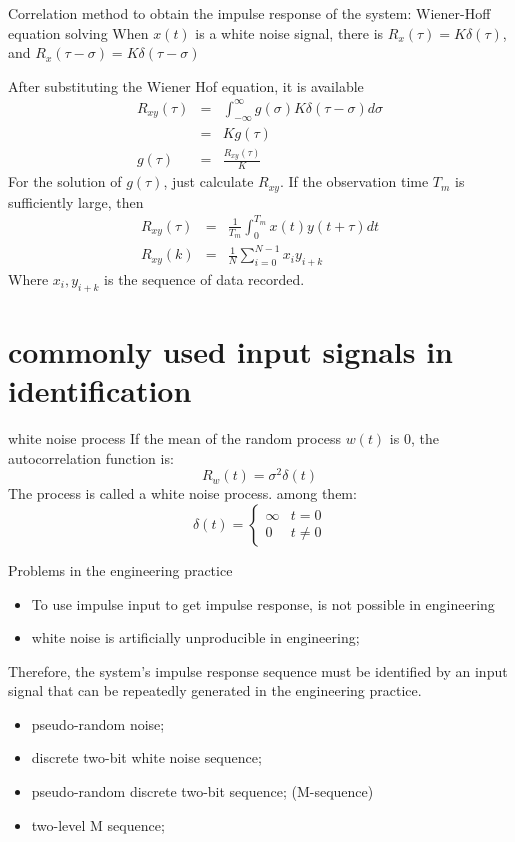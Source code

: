 \begin{frame}{Correlation method to obtain the impulse response of the system: Wiener-Hoff equation solving}
When $x(t)$ is a white noise signal, there is $R_x(\tau)=K\delta(\tau)$, and
$R_x(\tau-\sigma) = K\delta(\tau-\sigma)$

After substituting the Wiener Hof equation, it is available
\begin{eqnarray*}
R_{xy}(\tau) &=& \int_{-\infty}^{\infty}g(\sigma)K\delta(\tau-\sigma)d\sigma \\
&=& Kg(\tau) \\
g(\tau)&=& \frac{R_{xy}(\tau)}{K}
\end{eqnarray*}
For the solution of $g(\tau)$, just calculate $R_{xy}$. If the observation time $T_m$ is sufficiently large, then
\begin{eqnarray*}
R_{xy}(\tau) &=& \frac{1}{T_m}\int_0^{T_m}x(t)y(t+\tau)dt \\
R_{xy}(k) &=& \frac{1}{N}\sum_{i=0}^{N-1}x_i y_{i+k}
\end{eqnarray*}
Where $x_i, y_{i+k}$ is the sequence of data recorded.
\end{frame}

\section{commonly used input signals in identification}
\begin{frame}{white noise process}
If the mean of the random process $w(t)$ is 0, the autocorrelation function is:
$$
R_w(t)=\sigma^2\delta(t)
$$
The process is called a white noise process.
among them:
$$
\delta(t)=\begin{cases}
\infty & t=0 \\ 0 & t\neq 0
\end{cases}
$$
\end{frame}

\begin{frame}{Problems in the engineering practice}
\begin{itemize}
\item To use impulse input to get impulse response, is not possible in engineering
\item white noise is artificially unproducible in engineering;
\end{itemize}
Therefore, the system's impulse response sequence must be identified by an input signal that can be repeatedly generated in the engineering practice.
\begin{itemize}
\item pseudo-random noise;
\item discrete two-bit white noise sequence;
\item pseudo-random discrete two-bit sequence; (M-sequence)
\item two-level M sequence;
\end{itemize}
\end{frame}

